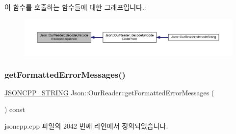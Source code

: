 이 함수를 호출하는 함수들에 대한 그래프입니다.\+:\nopagebreak
\begin{figure}[H]
\begin{center}
\leavevmode
\includegraphics[width=350pt]{class_json_1_1_our_reader_adb39be814cc6076b91a0919bdd5b24b0_icgraph}
\end{center}
\end{figure}
\mbox{\label{class_json_1_1_our_reader_a7971de51d73bb4aee5b0c4742c4aaaac}} 
\subsubsection{\texorpdfstring{get\+Formatted\+Error\+Messages()}{getFormattedErrorMessages()}}
{\footnotesize\ttfamily \hyperlink{json_8h_a1e723f95759de062585bc4a8fd3fa4be}{J\+S\+O\+N\+C\+P\+P\+\_\+\+S\+T\+R\+I\+NG} Json\+::\+Our\+Reader\+::get\+Formatted\+Error\+Messages (\begin{DoxyParamCaption}{ }\end{DoxyParamCaption}) const}



jsoncpp.\+cpp 파일의 2042 번째 라인에서 정의되었습니다.


